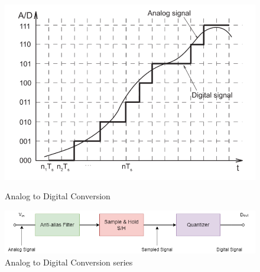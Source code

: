 \begin{figure}[htbp]
\centering
\includegraphics[scale=0.5]{images/ADC.png}
\caption{Analog to Digital Conversion}
\label{fig:x Conversion)}
\includegraphics[scale=0.5]{images/ConversionChain.png}
\caption{Analog to Digital Conversion series}
\label{fig:x Conversion series)}
\end{figure}

